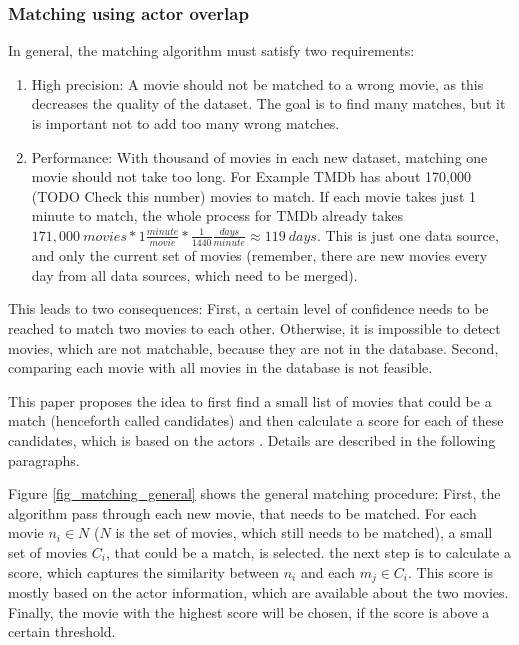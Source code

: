 \subsubsection{Matching using actor overlap}
In general, the matching algorithm must satisfy two requirements:
\begin{enumerate}
	\item{High precision:} A movie should not be matched to a wrong movie, as this decreases the quality of the dataset. The goal is to find many matches, but it is important not to add too many wrong matches.
	\item{Performance:} With thousand of movies in each new dataset, matching one movie should not take too long.  For Example TMDb has about 170,000 (TODO Check this number) movies to match.
	If each movie takes just 1 minute to match, the whole process for TMDb already takes $171,000~movies * 1 \frac{minute}{movie} * \frac{1}{1440} \frac{days}{minute} \approx 119~days$.
	This is just one data source, and only the current set of movies (remember, there are new movies every day from all data sources, which need to be merged).
\end{enumerate}

This leads to two consequences: First, a certain level of confidence needs to be reached to match two movies to each other. Otherwise, it is impossible to detect movies, which are not matchable, because they are not in the database.
Second, comparing each movie with all movies in the database is not feasible.

This paper proposes the idea to first find a small list of movies that could be a match (henceforth called candidates) and then calculate a score for each of these candidates, which is based on the actors . Details are described in the following paragraphs.

Figure \ref{fig_matching_general} shows the general matching procedure:
First, the algorithm pass through each new movie, that needs to be matched.
For each movie $n_i \in N$ ($N$ is the set of movies, which still needs to be matched), a small set of movies $C_{i}$, that could be a match, is selected.
the next step is to calculate a score, which captures the similarity between $n_i$ and each $m_j \in C_i$.
This score is mostly based on the actor information, which are available about the two movies.
Finally, the movie with the highest score will be chosen, if the score is above a certain threshold.

